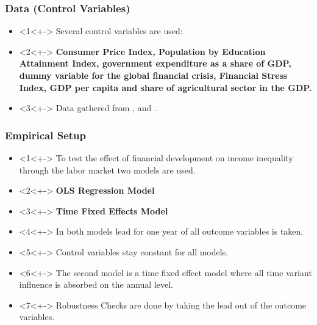 \documentclass[11pt]{beamer}
\begin{document}
\begin{frame}
\frametitle{Data (Control Variables)}
\begin{itemize}
\item<1<+-> Several control variables are used:
\item<2<+-> \textbf{Consumer Price Index, Population by Education Attainment Index, government expenditure as a share of GDP, dummy variable for the global financial crisis, Financial Stress Index, GDP per capita and share of agricultural sector in the GDP.}
\item<3<+-> Data gathered from \cite{DeutscheBundesbank}, \cite{EuropeanCentralBank} and \cite{Eurostat}.
\end{itemize}
\end{frame}

\begin{frame}
\frametitle{Empirical Setup}
\begin{itemize}
\item<1<+-> To test the effect of financial development on income inequality through the labor market two models are used.
\item<2<+-> \textbf{OLS Regression Model}
\item<3<+-> \textbf{Time Fixed Effects Model}
\item<4<+-> In both models lead for one year of all outcome variables is taken.
\item<5<+-> Control variables stay constant for all models.
\item<6<+-> The second model is a time fixed effect model where all time variant influence is absorbed on the annual level.
\item<7<+-> Robustness Checks are done by taking the lead out of the outcome variables.
\end{itemize}
\end{frame}
\end{document}
